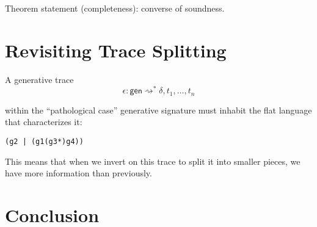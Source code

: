 \documentclass[fullpage, 11pt]{article}
\newcommand{\lolli}{\multimap}
\newcommand{\stepsto}{\rightsquigarrow}
\begin{document}
Theorem statement (completeness): converse of soundness.

\section{Revisiting Trace Splitting}

A generative trace
\[
\epsilon : \mathsf{gen} \stepsto^* \delta, t_1, \dots, t_n
\]

within the ``pathological case'' generative signature must inhabit the
flat language that characterizes it:

\begin{verbatim}
(g2 | (g1(g3*)g4))
\end{verbatim}

This means that when we invert on this trace to split it into smaller
pieces, we have more information than previously.


\section{Conclusion}


% 





\end{document}
